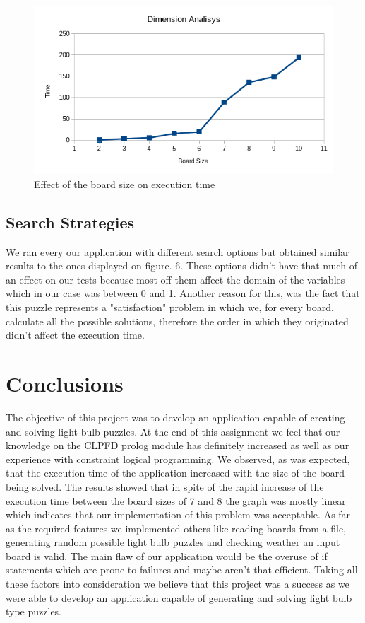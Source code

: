 \documentclass[runningheads]{llncs}
\begin{document}
\begin{figure}
	\includegraphics[scale=0.5]{graph}
	\centering
	\caption{Effect of the board size on execution time}
	\centering
\end{figure}

\subsection{Search Strategies}
We ran every our application with different search options but obtained similar results to the ones displayed on figure. 6. These options didn't have that much of an effect on our tests because most off them affect the domain of the variables which in our case was between 0 and 1. Another reason for this, was the fact that this puzzle represents a "satisfaction" problem in which we, for every board, calculate all the possible solutions, therefore the order in which they originated didn't affect the execution time.

\section{Conclusions}
The objective of this project was to develop an application capable of creating and solving light bulb puzzles. At the end of this assignment we feel that our knowledge on the CLPFD prolog module has definitely increased as well as our experience with constraint logical programming.
We observed, as was expected, that the execution time of the application increased with the size of the board being solved.
The results showed that in spite of the rapid increase of the execution time between the board sizes of 7 and 8 the graph was mostly linear which indicates that our implementation of this problem was acceptable.
As far as the required features we implemented others like reading boards from a file, generating random possible light bulb puzzles and checking weather an input board is valid.
The main flaw of our application would be the overuse of if statements which are prone to failures and maybe aren't that efficient. 
Taking all these factors into consideration we believe that this project was a success as we were able to develop an application capable of generating and solving light bulb type puzzles.
\end{document}
